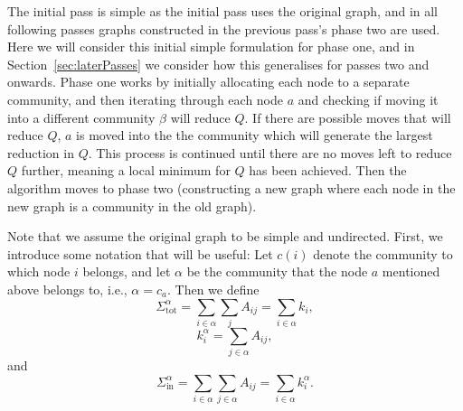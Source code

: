 \documentclass{article}
\begin{document}
The initial pass is simple as the initial pass uses the original graph, 
and in all following passes graphs constructed in the previous pass's 
phase two are used.
Here we will consider this initial simple formulation for phase one, and
in Section~\ref{sec:laterPasses} we consider how this generalises for 
passes two and onwards. 
Phase one works by initially allocating each node to a separate community,
and then iterating through each node $a$ and checking if moving it into 
a different community $\beta$ will reduce $Q$.
If there are possible moves that will reduce $Q$, $a$ is moved into the 
the community which will generate the largest reduction in $Q$. 
This process is continued until there are no moves left to reduce $Q$ 
further, meaning a local minimum for $Q$ has been achieved. 
Then the algorithm moves to phase two (constructing a new graph where
each node in the new graph is a community in the old graph). 

Note that we assume the original graph to be simple and undirected.
First, we introduce some notation that will be useful:
Let $c(i)$ denote the community to which node $i$ belongs, 
and let $\alpha$ be the community that the node $a$ mentioned above
belongs to, i.e., $\alpha = c_a$.
Then we define
\newcommand{\Stot}[1]{\Sigma_{\text{tot}}^{#1}}
\begin{equation}
	\Stot{\alpha} = \sum_{i \in \alpha}\sum_{j}A_{ij} = \sum_{i \in \alpha}k_i,
\end{equation}
\newcommand{\kin}[2]{k_{#1}^{#2}}
\begin{equation}
	\kin{i}{\alpha} = \sum_{j \in \alpha}A_{ij},
\end{equation}
and
\newcommand{\Sin}[1]{\Sigma_{\text{in}}^{#1}}
\begin{equation}
	\Sin{\alpha} = \sum_{i \in \alpha}\sum_{j \in \alpha}A_{ij} = \sum_{i \in \alpha}\kin{i}{\alpha}.
\end{equation}
\end{document}

